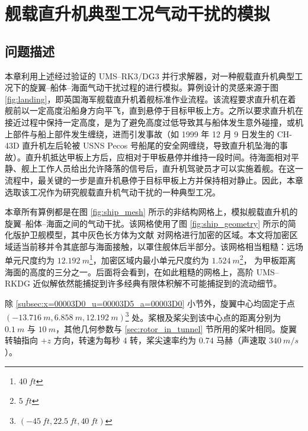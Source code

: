 \chapter{舰载直升机典型工况气动干扰的模拟\label{chap:=005E94=007528}}

\section{问题描述}

本章利用上述经过验证的 UMS–RK3/DG3 并行求解器，对一种舰载直升机典型工况下的旋翼–船体–海面气动干扰过程的进行模拟。算例设计的灵感来源于图
\ref{fig:landing}，即英国海军舰载直升机着舰标准作业流程。该流程要求直升机在着舰前以一定高度沿船身方向平飞，直到悬停于目标甲板上方。之所以要求直升机在接近过程中保持一定高度，是为了避免高度过低导致其与船体发生意外碰撞，或机上部件与船上部件发生缠绕，进而引发事故（如
1999 年 12 月 9 日发生的 CH-43D 直升机左后轮被 USNS Pecos 号船尾的安全网缠绕，导致直升机坠海的事故）。直升机抵达甲板上方后，应相对于甲板悬停并维持一段时间。待海面相对平静、舰上工作人员给出允许降落的信号后，直升机驾驶员才可以实施着舰。在这一流程中，最关键的一步是直升机悬停于目标甲板上方并保持相对静止。因此，本章选取该工况作为研究舰载直升机气动干扰的一种典型工况。

本章所有算例都是在图 \ref{fig:ship_mesh} 所示的非结构网格上，模拟舰载直升机的旋翼–船体–海面之间的气动干扰。该网格使用了图
\ref{fig:ship_geometry} 所示的简化版护卫舰模型，其中灰色长方体为文献 \cite{Thedin_2020}
对网格进行加密的区域。本文将加密区域适当前移并令其底部与海面接触，以罩住舰体后半部分。该网格相当粗糙：远场单元尺度约为 $\SI{12.192}{m}$\footnote{$\SI{40}{ft}$}，加密区域内最小单元尺度约为
$\SI{1.524}{m}$\footnote{$\SI{5}{ft}$}， 为甲板距离海面的高度的三分之一。后面将会看到，在如此粗糙的网格上，高阶
UMS–RKDG 近似解依然能捕捉到许多经典有限体积解不可能捕捉到的流动细节。

除 \ref{subsec:x=00003D0_u=00003D5_a=00003D0} 小节外，旋翼中心均固定于点 $(\SI{-13.716}{m},\SI{6.858}{m},\SI{12.192}{m})$\footnote{$(\SI{-45}{ft},\SI{22.5}{ft},\SI{40}{ft})$}
处。桨根及桨尖到该中心点的距离分别为 $\SI{0.1}{m}$ 与 $\SI{10}{m}$，其他几何参数与 \ref{sec:rotor_in_tunnel}
节所用的桨叶相同。旋翼转轴指向 $+z$ 方向，转速为每秒 $4$ 转，桨尖速率约为 $0.74$ 马赫（声速取 $\SI{340}{m/s}$）。

